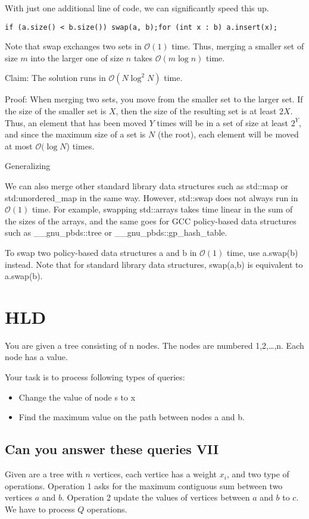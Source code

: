     With just one additional line of code, we can significantly speed this up.
    
    \lstinline{if (a.size() < b.size()) swap(a, b);for (int x : b) a.insert(x);}
    
    Note that swap exchanges two
    sets in $\mathcal{O}(1)$ time. Thus, merging a smaller set of size $m$ into the
    larger one of size $n$ takes $\mathcal{O}(m\log n)$ time.
    
    Claim: The solution runs in $\mathcal{O}(N\log^2N)$ time.
    
    Proof: When merging two sets, you move from the smaller set to the larger
    set. If the size of the smaller set is $X$, then the size of the resulting set
    is at least $2X$. Thus, an element that has been moved $Y$ times will be in a
    set of size at least $2^Y$, and since the maximum size of a set is $N$ (the
    root), each element will be moved at most $\mathcal{O}(\log N$) times.

    Generalizing

    We can also merge other standard library data structures such as std::map or
    std:unordered\_map in the same way. However,
    std::swap does not always
    run in $\mathcal{O}(1)$ time. For example, swapping
    std::arrays takes time
    linear in the sum of the sizes of the arrays, and the same goes for
    GCC policy-based data structures such
    as \_\_gnu\_pbds::tree or \_\_gnu\_pbds::gp\_hash\_table.
    
    To swap two policy-based data structures a and b in $\mathcal{O}(1)$ time,
    use a.swap(b) instead. Note that for standard library data structures,
    swap(a,b) is equivalent to a.swap(b).
    
    \section{HLD}
    You are given a tree consisting of n nodes. The nodes are numbered 1,2,…,n. Each node has a value.

    Your task is to process following types of queries:
    \begin{itemize}
        \item Change the value of node s to x
        \item Find the maximum value on the path between nodes a and b.
    \end{itemize}

    
    \subsection{Can you answer these queries VII}
        Given are a tree with $n$ vertices, each vertice has a weight $x_i$, and two type of operations. Operation 1 asks for the maximum contiguous sum between two vertices $a$ and $b$. Operation 2 update the values of vertices between $a$ and $b$ to $c$. We have to process $Q$ operations.
        
